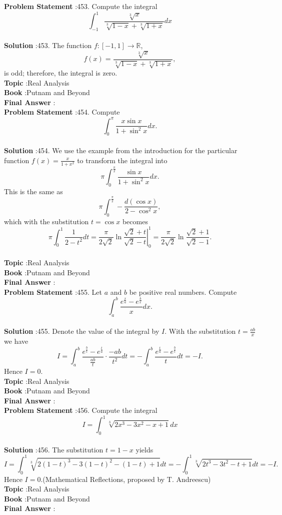 \documentclass[10pt]{article}
\begin{document}
\textbf{Problem Statement} :453. Compute the integral$$ \int_{-1}^{1} \frac{\sqrt[3]{x}}{\sqrt[3]{1-x}+\sqrt[3]{1+x}} d x $$\\
\textbf{Solution} :453. The function $f:[-1,1] \rightarrow \mathbb{R}$,$$ f(x)=\frac{\sqrt[3]{x}}{\sqrt[3]{1-x}+\sqrt[3]{1+x}}, $$is odd; therefore, the integral is zero.\\
\textbf{Topic} :Real Analysis\\
\textbf{Book} :Putnam and Beyond\\
\textbf{Final Answer} :\\


\textbf{Problem Statement} :454. Compute$$ \int_{0}^{\pi} \frac{x \sin x}{1+\sin ^{2} x} d x . $$\\
\textbf{Solution} :454. We use the example from the introduction for the particular function $f(x)=\frac{x}{1+x^{2}}$ to transform the integral into$$ \pi \int_{0}^{\frac{\pi}{2}} \frac{\sin x}{1+\sin ^{2} x} d x . $$This is the same as$$ \pi \int_{0}^{\frac{\pi}{2}}-\frac{d(\cos x)}{2-\cos ^{2} x}, $$which with the substitution $t=\cos x$ becomes$$ \pi \int_{0}^{1} \frac{1}{2-t^{2}} d t=\left.\frac{\pi}{2 \sqrt{2}} \ln \frac{\sqrt{2}+t}{\sqrt{2}-t}\right|_{0} ^{1}=\frac{\pi}{2 \sqrt{2}} \ln \frac{\sqrt{2}+1}{\sqrt{2}-1} . $$\\
\textbf{Topic} :Real Analysis\\
\textbf{Book} :Putnam and Beyond\\
\textbf{Final Answer} :\\


\textbf{Problem Statement} :455. Let $a$ and $b$ be positive real numbers. Compute$$ \int_{a}^{b} \frac{e^{\frac{x}{a}}-e^{\frac{b}{x}}}{x} d x . $$\\
\textbf{Solution} :455. Denote the value of the integral by $I$. With the substitution $t=\frac{a b}{x}$ we have$$ I=\int_{a}^{b} \frac{e^{\frac{b}{t}}-e^{\frac{t}{a}}}{\frac{a b}{t}} \cdot \frac{-a b}{t^{2}} d t=-\int_{a}^{b} \frac{e^{\frac{t}{a}}-e^{\frac{b}{t}}}{t} d t=-I . $$Hence $I=0$.\\
\textbf{Topic} :Real Analysis\\
\textbf{Book} :Putnam and Beyond\\
\textbf{Final Answer} :\\


\textbf{Problem Statement} :456. Compute the integral$$ I=\int_{0}^{1} \sqrt[3]{2 x^{3}-3 x^{2}-x+1} d x $$\\
\textbf{Solution} :456. The substitution $t=1-x$ yields$$ I=\int_{0}^{1} \sqrt[3]{2(1-t)^{3}-3(1-t)^{2}-(1-t)+1} d t=-\int_{0}^{1} \sqrt[3]{2 t^{3}-3 t^{2}-t+1} d t=-I . $$Hence $I=0$.(Mathematical Reflections, proposed by T. Andreescu)\\
\textbf{Topic} :Real Analysis\\
\textbf{Book} :Putnam and Beyond\\
\textbf{Final Answer} :\\
\end{document}
